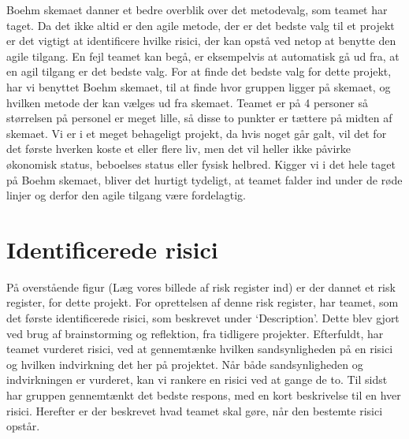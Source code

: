 Boehm skemaet danner et bedre overblik over det metodevalg, som teamet har taget. Da det ikke altid er den agile metode, der er det bedste valg til et projekt er det vigtigt at identificere hvilke risici, der kan opstå ved netop at benytte den agile tilgang. En fejl teamet kan begå, er eksempelvis at automatisk gå ud fra, at en agil tilgang er det bedste valg. For at finde det bedste valg for dette projekt, har vi benyttet Boehm skemaet, til at finde hvor gruppen ligger på skemaet, og hvilken metode der kan vælges ud fra skemaet.
Teamet er på 4 personer så størrelsen på personel er meget lille, så disse to punkter er tættere på midten af skemaet. Vi er i et meget behageligt projekt, da hvis noget går galt, vil det for det første hverken koste et eller flere liv, men det vil heller ikke påvirke økonomisk status, beboelses status eller fysisk helbred. Kigger vi i det hele taget på Boehm skemaet, bliver det hurtigt tydeligt, at teamet falder ind under de røde linjer og derfor den agile tilgang være fordelagtig.


\section{Identificerede risici}

På overstående figur (Læg vores billede af risk register ind) er der dannet et risk register, for dette projekt. For oprettelsen af denne risk register, har teamet, som det første identificerede risici, som beskrevet under ‘Description’. Dette blev gjort ved brug af brainstorming og reflektion, fra tidligere projekter. Efterfuldt, har teamet vurderet risici, ved at gennemtænke hvilken sandsynligheden på en risici og hvilken indvirkning det her på projektet. Når både sandsynligheden og indvirkningen er vurderet, kan vi rankere en risici ved at gange de to. Til sidst har gruppen gennemtænkt det bedste respons, med en kort beskrivelse til en hver risici. Herefter er der beskrevet hvad teamet skal gøre, når den bestemte risici opstår. 